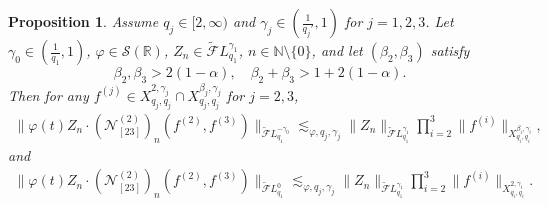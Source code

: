 \documentclass[11pt,reqno,english]{amsart}
\numberwithin{equation}{section}
\theoremstyle{plain}
\newtheorem{proposition}[theorem]{Proposition}
\theoremstyle{definition}
\theoremstyle{remark}
\newcommand{\R}{\mathbb{R}}
\newcommand{\N}{\mathbb{N}}
\begin{document}
\begin{proposition}\label{bilinear}
	Assume $q_j\in [2,\infty)$ and $\gamma_j\in(\frac{1}{q_j'},1)$ for $j=1,2,3$.
	Let $\gamma_0\in(\frac{1}{q_1},1)$, $\varphi\in \mathcal{S}(\R)$, $Z_n\in \widetilde{\mathcal{F}}L_{q_1}^{\gamma_1}$, $n\in\N\setminus\{0\}$, and let $(\beta_{2},\beta_{3})$ satisfy
	\[
	\beta_2,\beta_3>2(1-\alpha),\quad \beta_2+\beta_3>1+2(1-\alpha).
	\]
	Then for any $f^{(j)}\in X_{q_j,q_j}^{2,\gamma_j}\cap X_{q_j,q_j}^{\beta_j,\gamma_j}$ for $j=2,3$,
	\begin{align}\label{bilinear-1}
		\|\varphi(t)Z_n\cdot
		\left(\mathcal{N}_{[23]}^{(2)}\right)_n\left(f^{(2)},f^{(3)}\right)\|_{\widetilde{\mathcal{F}}L_{q_1}^{-\gamma_0}}\lesssim_{\varphi,q_j,\gamma_j}
		\|Z_n\|_{\widetilde{\mathcal{F}}L_{q_1}^{\gamma_1}}
		\prod_{i=2}^{3}\|f^{(i)}\|_{X_{q_i,q_i}^{\beta_i,\gamma_i}},
	\end{align}
	and
	\begin{align}\label{bilinear-2}
		\|\varphi(t)Z_n\cdot
		\left(
		\mathcal{N}_{[23]}^{(2)}\right)_n\left(f^{(2)},f^{(3)}
		\right)\|_{\widetilde{\mathcal{F}}L_{q_1}^{0}}\lesssim_{\varphi,q_j,\gamma_j} \|Z_n\|_{\widetilde{\mathcal{F}}L_{q_1}^{\gamma_1}}
		\prod_{i=2}^{3}\|f^{(i)}\|_{X_{q_i,q_i}^{2,\gamma_i}}.
	\end{align}
\end{proposition}
\end{document}
